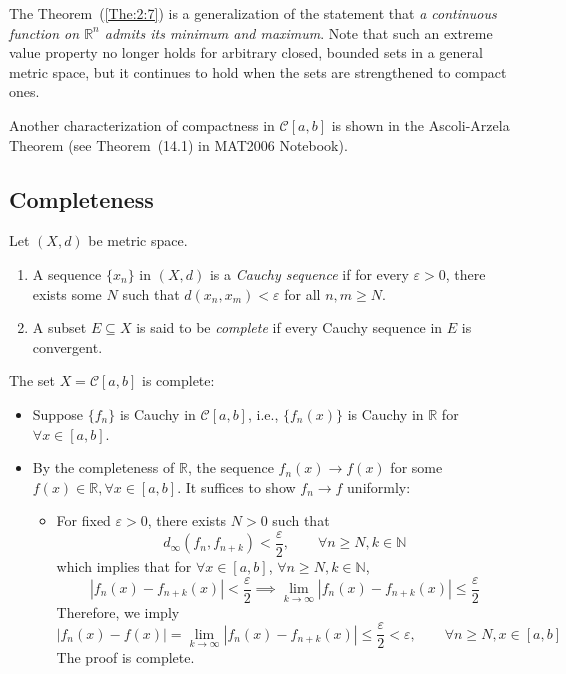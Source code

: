 \begin{remark}
The Theorem~(\ref{The:2:7}) is a generalization of the statement that \textit{a continuous function on $\mathbb{R}^n$ admits its minimum and maximum}. Note that such an extreme value property no longer holds for arbitrary closed, bounded sets in a general metric space, but it continues to hold when the sets are strengthened to compact ones.

Another characterization of compactness in $\mathcal{C}[a,b]$ is shown in the Ascoli-Arzela Theorem (see Theorem~(14.1) in MAT2006 Notebook).
\end{remark}

\subsection{Completeness}
\begin{definition}[Complete]
Let $(X,d)$ be metric space.
\begin{enumerate}
\item
A sequence $\{x_n\}$ in $(X,d)$ is a \emph{Cauchy sequence} if for every $\varepsilon>0$, there exists some $N$ such that $d(x_n,x_m)<\varepsilon$ for all $n,m\ge N$.
\item
A subset $E\subseteq X$ is said to be \emph{complete} if every Cauchy sequence in $E$ is convergent.
\end{enumerate}
\end{definition}

\begin{example}\label{exp:2:15}
The set $X=\mathcal{C}[a,b]$ is complete:
\begin{itemize}
\item
Suppose $\{f_n\}$ is Cauchy in $\mathcal{C}[a,b]$, i.e., $\{f_n(x)\}$ is Cauchy in $\mathbb{R}$ for $\forall x\in[a,b]$.
\item
By the completeness of $\mathbb{R}$, the sequence $f_n(x)\to f(x)$ for some $f(x)\in\mathbb{R},\forall x\in[a,b]$. It suffices to show $f_n\to f$ uniformly:
\begin{itemize}
\item
For fixed $\varepsilon>0$, there exists $N>0$ such that
\[
d_\infty(f_n,f_{n+k})<\frac{\varepsilon}{2},\qquad
\forall n\ge N,k\in\mathbb{N}
\]
which implies that for $\forall x\in[a,b]$, $\forall n\ge N,k\in\mathbb{N}$,
\[
|f_n(x)-f_{n+k}(x)|<\frac{\varepsilon}{2}
\implies
\lim_{k\to\infty}|f_n(x)-f_{n+k}(x)|\le\frac{\varepsilon}{2}
\]
Therefore, we imply
\[
|f_n(x)-f(x)|=\lim_{k\to\infty}|f_n(x)-f_{n+k}(x)|\le\frac{\varepsilon}{2}<\varepsilon,\qquad
\forall n\ge N,x\in[a,b]
\]
The proof is complete.
\end{itemize}
\end{itemize}
\end{example}


















